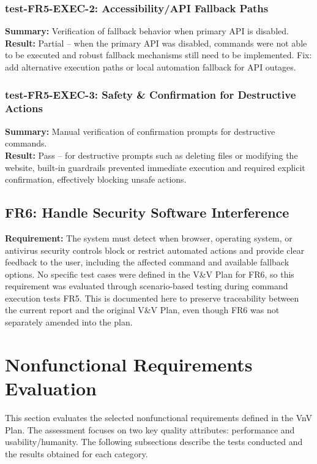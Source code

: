 \documentclass[12pt, titlepage]{article}
\begin{document}
\subsubsection{test-FR5-EXEC-2: Accessibility/API Fallback Paths}
\textbf{Summary:} Verification of fallback behavior when primary API is disabled.\\
\textbf{Result:} Partial -- when the primary API was disabled, commands were not able to be executed and robust fallback mechanisms still need to be implemented. Fix: add alternative execution paths or local automation fallback for API outages.

\subsubsection{test-FR5-EXEC-3: Safety \& Confirmation for Destructive Actions}
\textbf{Summary:} Manual verification of confirmation prompts for destructive commands.\\
\textbf{Result:} Pass -- for destructive prompts such as deleting files or modifying the website, built-in guardrails prevented immediate execution and required explicit confirmation, effectively blocking unsafe actions.

\subsection{FR6: Handle Security Software Interference}

\textbf{Requirement:} The system must detect when browser, operating system, or antivirus security controls block or restrict automated actions and provide clear feedback to the user, including the affected command and available fallback options. No specific test cases were defined in the V\&V Plan for FR6, so this requirement was evaluated through scenario-based testing during command execution tests FR5. This is documented here to preserve traceability between the current report and the original V\&V Plan, even though FR6 was not separately amended into the plan.

\section{Nonfunctional Requirements Evaluation}
This section evaluates the selected nonfunctional requirements defined in the VnV Plan. The assessment focuses on two key quality attributes: performance and usability/humanity. The following subsections describe the tests conducted and the results obtained for each category.
\end{document}

